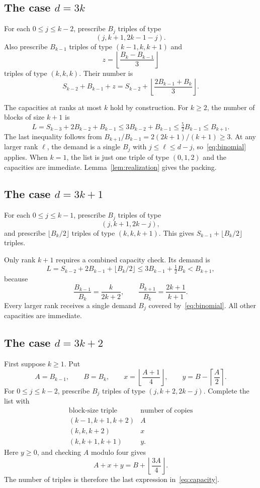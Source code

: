 \documentclass[11pt]{article}
\theoremstyle{definition}
\numberwithin{equation}{section}
\begin{document}
\subsection{The case \texorpdfstring{$d=3k$}{d=3k}}

For each $0\leq j\leq k-2$, prescribe $B_j$ triples of type
\[
 (j,k+1,2k-1-j).
\]
Also prescribe $B_{k-1}$ triples of type $(k-1,k,k+1)$ and
\[
 z=\left\lfloor\frac{B_k-B_{k-1}}3\right\rfloor
\]
triples of type $(k,k,k)$. Their number is
\[
 S_{k-2}+B_{k-1}+z
 =S_{k-2}+\left\lfloor\frac{2B_{k-1}+B_k}{3}\right\rfloor.
\]

The capacities at ranks at most $k$ hold by construction.
For $k\geq2$, the number of blocks of size $k+1$ is
\[
 L=S_{k-3}+2B_{k-2}+B_{k-1}
 \leq3B_{k-2}+B_{k-1}\leq\tfrac52 B_{k-1}\leq B_{k+1}.
\]
The last inequality follows from
$B_{k+1}/B_{k-1}=2(2k+1)/(k+1)\geq3$.
At any larger rank $\ell$, the demand is a single $B_j$ with
$j\leq\ell\leq d-j$, so~\eqref{eq:binomial} applies.
When $k=1$, the list is just one triple of type $(0,1,2)$ and the
capacities are immediate. Lemma~\ref{lem:realization} gives the packing.

\subsection{The case \texorpdfstring{$d=3k+1$}{d=3k+1}}

For each $0\leq j\leq k-1$, prescribe $B_j$ triples of type
\[
 (j,k+1,2k-j),
\]
and prescribe $\lfloor B_k/2\rfloor$ triples of type $(k,k,k+1)$.
This gives $S_{k-1}+\lfloor B_k/2\rfloor$ triples.

Only rank $k+1$ requires a combined capacity check. Its demand is
\[
 L=S_{k-2}+2B_{k-1}+\lfloor B_k/2\rfloor
 \leq3B_{k-1}+\tfrac12B_k < B_{k+1},
\]
because
\[
 \frac{B_{k-1}}{B_k}=\frac{k}{2k+2},
 \qquad
 \frac{B_{k+1}}{B_k}=\frac{2k+1}{k+1}.
\]
Every larger rank receives a single demand $B_j$ covered
by~\eqref{eq:binomial}. All other capacities are immediate.

\subsection{The case \texorpdfstring{$d=3k+2$}{d=3k+2}}

First suppose $k\geq1$. Put
\[
 A=B_{k-1},\qquad B=B_k,\qquad
 x=\left\lfloor\frac{A+1}{4}\right\rfloor,\qquad
 y=B-\left\lceil\frac A2\right\rceil.
\]
For $0\leq j\leq k-2$, prescribe $B_j$ triples of type
$(j,k+2,2k-j)$. Complete the list with
\[
 \begin{array}{c|c}
 \text{block-size triple}&\text{number of copies}\\ \hline
 (k-1,k+1,k+2)&A\\
 (k,k,k+2)&x\\
 (k,k+1,k+1)&y .
 \end{array}
\]
Here $y\geq0$, and checking $A$ modulo four gives
\[
 A+x+y=B+\left\lfloor\frac{3A}{4}\right\rfloor.
\]
The number of triples is therefore the last expression
in~\eqref{eq:capacity}.
\end{document}
